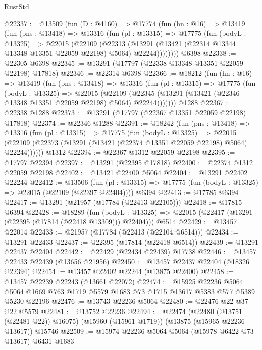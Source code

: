 \begin{lexlean}{RustStd}
\begin{coremodule}
@22337 := @13509
    (fun (D : @4160) =>
    @17774
      (fun (hn : @16) =>
      @13419
        (fun (pns : @13418) =>
        @13316
          (fun (pl : @13315) =>
          @17775
            (fun (bodyL : @13325) =>
            @22015
              (@22109
                (@22313
                  (@13291 (@13421 (@22314 @13344 @13348 @13351 @22059 @22198) @5064) @22244))))))))
    @6398
@22338 := @22305 @6398
@22345 := @13291 (@17797 (@22338 @13348 @13351 @22059 @22198) @17818)
@22346 := @22314 @6398
@22366 := @18212
    (fun (hn : @16) =>
    @13419
      (fun (pns : @13418) =>
      @13316
        (fun (pl : @13315) =>
        @17775
          (fun (bodyL : @13325) =>
          @22015
            (@22109
              (@22345 (@13291 (@13421 (@22346 @13348 @13351 @22059 @22198) @5064) @22244)))))))
    @1288
@22367 := @22338 @1288
@22373 := @13291 (@17797 (@22367 @13351 @22059 @22198) @17818)
@22374 := @22346 @1288
@22391 := @18242
    (fun (pns : @13418) =>
    @13316
      (fun (pl : @13315) =>
      @17775
        (fun (bodyL : @13325) =>
        @22015 (@22109 (@22373 (@13291 (@13421 (@22374 @13351 @22059 @22198) @5064) @22244))))))
    @1312
@22394 := @22367 @1312 @22059 @22198
@22395 := @17797 @22394
@22397 := @13291 (@22395 @17818)
@22400 := @22374 @1312 @22059 @22198
@22402 := @13421 @22400 @5064
@22404 := @13291 @22402 @22244
@22412 := @13506
    (fun (pl : @13315) => @17775 (fun (bodyL : @13325) => @22015 (@22109 (@22397 @22404))))
    @6394
@22413 := @17785 @6394
@22417 := @13291 (@21957 (@17784 (@22413 @22105)))
@22418 := @17815 @6394
@22428 := @18289
    (fun (bodyL : @13325) => @22015 (@22417 (@13291 (@22395 (@17814 (@22418 @13309))) @22404)))
    @6514
@22429 := @13457 @22014
@22433 := @21957 (@17784 (@22413 (@22104 @6514)))
@22434 := @13291 @22433
@22437 := @22395 (@17814 (@22418 @6514))
@22439 := @13291 @22437 @22404
@22442 := @22429 (@22434 @22439) @17738
@22446 := @13457 @22433 @22439 (@13656 @21956)
@22450 := @13457 @22437 @22404 (@18326 @22394)
@22454 := @13457 @22402 @22244 (@13875 @22400)
@22458 := @13457 @22239 @22243 (@13661 @22072)
@22474 := @15925
    @22236
    @5064
    @5064
    @1669
    @763
    @1719
    @5579
    @1683
    @73
    @1715
    @13617
    @5383
    @577
    @5389
    @5230
    @22196
@22476 := @13743 @22236 @5064
@22480 := @22476 @22 @37 @22 @5579
@22481 := @13752 @22236
@22494 := @22474
    (@22480 (@13751 (@22481 @22)) @16075)
    (@15960 (@15961 @1719))
    (@13875 (@15965 @22236 @13617))
    @15746
@22509 := @15974
    @22236
    @5064
    @5064
    (@15978 @6422 @73 @13617)
    @6431
    @1683

\end{coremodule}
\end{lexlean}
